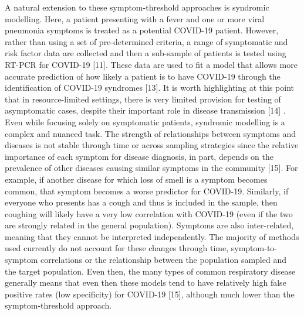 \documentclass[]{elsarticle} %
\begin{document}
A natural extension to these symptom-threshold approaches is syndromic modelling.
Here, a patient presenting with a fever and one or more viral pneumonia symptoms is treated as a potential COVID-19 patient.
However, rather than using a set of pre-determined criteria, a range of symptomatic and risk factor data are collected and then a sub-sample of patients is tested using RT-PCR for COVID-19 {[}11{]}.
These data are used to fit a model that allows more accurate prediction of how likely a patient is to have COVID-19 through the identification of COVID-19 syndromes {[}13{]}.
It is worth highlighting at this point that in resource-limited settings, there is very limited provision for testing of asymptomatic cases, despite their important role in disease transmission {[}14{]} .
Even while focusing solely on symptomatic patients, syndromic modelling is a complex and nuanced task.
The strength of relationships between symptoms and diseases is not stable through time or across sampling strategies since the relative importance of each symptom for disease diagnosis, in part, depends on the prevalence of other diseases causing similar symptoms in the community {[}15{]}.
For example, if another disease for which loss of smell is a symptom becomes common, that symptom becomes a worse predictor for COVID-19.
Similarly, if everyone who presents has a cough and thus is included in the sample, then coughing will likely have a very low correlation with COVID-19 (even if the two are strongly related in the general population). 
Symptoms are also inter-related, meaning that they cannot be interpreted independently.
The majority of methods used currently do not account for these changes through time, symptom-to-symptom correlations or the relationship between the population sampled and the target population.
Even then, the many types of common respiratory disease generally means that even then these models tend to have relatively high false positive rates (low specificity) for COVID-19 {[}15{]}, although much lower than the symptom-threshold approach.
\end{document}
